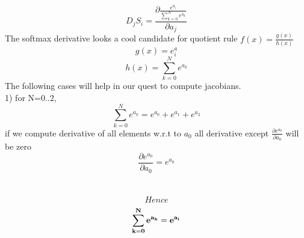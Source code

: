 \documentclass{article}
\begin{document}
\[ D_{j}S_{i}= \frac{\partial{\frac{e^{a_{i}}}{\sum_{k=0}^{N}e^{a_{k}}}}}{\partial{a_{j}}}\]
The softmax derivative looks a cool candidate for quotient rule $f(x)=\frac{g(x)}{h(x)}$
\[g(x)=e^a_{i}\]
\[h(x)=\sum_{k=0}^{N}{e^{a_{k}}}\]
The following cases will help in our quest to compute jacobians. \\

1) for N=0..2,
\[\sum_{k=0}^{N}{e^{a_{k}}}=e^{a_{0}}+e^{a_{1}}+e^{a_{2}}\]
	if we compute derivative of all elements w.r.t to $a_{0}$ all derivative except  $\frac{\partial{e^{a_{0}}}}{\partial{a_{0}}}$ will be zero 
\[\frac{\partial{e^{a_{0}}}}{\partial{a_{0}}}=e^{a_{0}}\]
\\
\\
\[Hence\]
\[\bf{\sum_{k=0}^{N}{e^{a_{k}}}=e^{a_{i}}}\]
\end{document}
